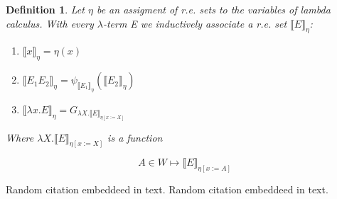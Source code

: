 \documentclass{article}
\newtheorem{definition}{Definition}[section] %
\begin{document}
	\begin{definition}
		Let $\eta$ be an assigment of r.e. sets to the variables of 
		lambda calculus. With every $\lambda$-term E we inductively 
		associate a r.e. set $\llbracket E \rrbracket_{\eta}$:
			\begin{enumerate}
				\item $\llbracket x \rrbracket_{\eta} = \eta (x)$
				\item $\llbracket E_1 E_2 \rrbracket_{\eta} = 
					\psi_{\llbracket E_1 \rrbracket_\eta} 
					(\llbracket E_2 \rrbracket_\eta)$
				\item $\llbracket \lambda x.E \rrbracket_{\eta} = 
					G_{\lambda X. \llbracket E \rrbracket_{\eta [x := X]}}$
			\end{enumerate}
			Where $\lambda X. \llbracket E \rrbracket_{\eta [x := X]}$ is a function

		\begin{equation}
			A \in W \mapsto \llbracket E \rrbracket_{\eta [x := A]}
		\end{equation}
	\end{definition}

	Random citation \cite{COM_COOPER} embeddeed in text.
	Random citation \cite{COM_ODIFREDDI} embeddeed in text.

	\newpage
	
	
\end{document}
